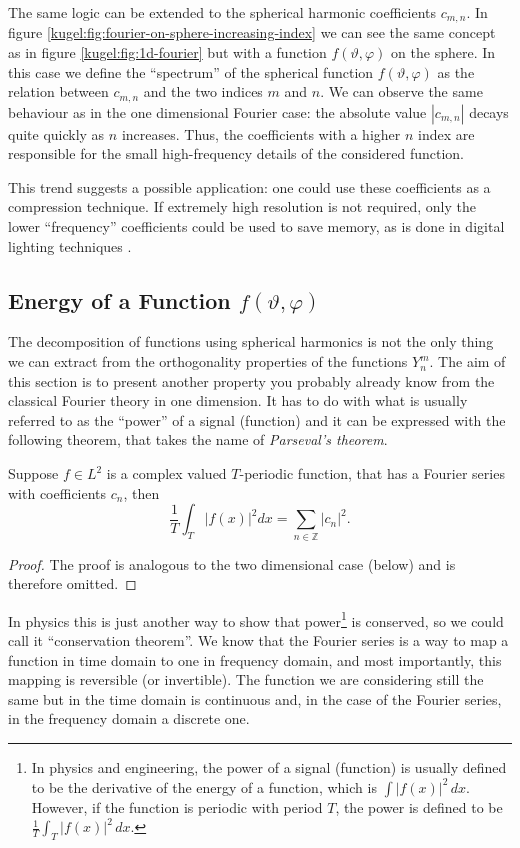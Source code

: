 The same logic can be extended to the spherical harmonic coefficients $c_{m,n}$.
In figure \ref{kugel:fig:fourier-on-sphere-increasing-index} we can see the same
concept as in figure \ref{kugel:fig:1d-fourier} but with a function
$f(\vartheta, \varphi)$ on the sphere. In this case we define the ``spectrum''
of the spherical function $f(\vartheta, \varphi)$ as the relation between
$c_{m,n}$ and the two indices $m$ and $n$. We can observe the same behaviour as
in the one dimensional Fourier case: the absolute value $|c_{m,n}|$ decays quite
quickly as $n$ increases. Thus, the coefficients with a higher $n$ index are
responsible for the small high-frequency details of the considered function.

This trend suggests a possible application: one could use these coefficients as
a compression technique. If extremely high resolution is not required, only the
lower ``frequency'' coefficients could be used to save memory, as is done in
digital lighting techniques \cite{SH_lighting_paper}.

\subsection{Energy of a Function $f(\vartheta, \varphi)$}

The decomposition of functions using spherical harmonics is not the only thing
we can extract from the orthogonality properties of the functions $Y^m_n$. The
aim of this section is to present another property you probably already know
from the classical Fourier theory in one dimension. It has to do with what is
usually referred to as the ``power'' of a signal (function) and it can be
expressed with the following theorem, that takes the name of \emph{Parseval's
theorem}.

\begin{theorem}
  \label{kugel:thm:parseval-1D}
  Suppose $f \in L^2$ is a complex valued $T$-periodic function, that has a
  Fourier series with coefficients $c_n$, then
  \begin{equation}
    \frac{1}{T}\int_T |f(x)|^2dx
    = \sum_{n \in \mathbb{Z}} |c_n|^2. 
    \label{kugel:eqn:parseval-1D}
  \end{equation}
\end{theorem}
\begin{proof}
  The proof is analogous to the two dimensional case (below) and is therefore omitted.
\end{proof}

In physics this is just another way to show that power\footnote{In physics and
engineering, the power of a signal (function) is usually defined to be the
derivative of the energy of a function, which is $\int | f(x) |^2 \, dx$.
However, if the function is periodic with period $T$, the power is defined to be
$\frac{1}{T} \int_T |f(x)|^2 \, dx$.} is conserved, so we could call it
``conservation theorem''. We know that the Fourier series is a way to map a
function in time domain to one in frequency domain, and most importantly, this
mapping is reversible (or invertible). The function we are considering still the
same but in the time domain is continuous and, in the case of the Fourier
series, in the frequency domain a discrete one.

